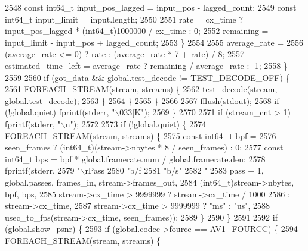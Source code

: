 \begin{DoxyCodeInclude}
{{{{{{{{{{{{{{{{{{{{{{{{{{{{{{{{{{{{{{{{{{{{{{{{{{{{{{{{{{{2548             \textcolor{keyword}{const} int64\_t input\_pos\_lagged = input\_pos - lagged\_count;
2549             \textcolor{keyword}{const} int64\_t input\_limit = input.length;
2550 
2551             rate = cx\_time ? input\_pos\_lagged * (int64\_t)1000000 / cx\_time : 0;
2552             remaining = input\_limit - input\_pos + lagged\_count;
2553           \}
2554 
2555           average\_rate =
2556               (average\_rate <= 0) ? rate : (average\_rate * 7 + rate) / 8;
2557           estimated\_time\_left = average\_rate ? remaining / average\_rate : -1;
2558         \}
2559 
2560         \textcolor{keywordflow}{if} (got\_data && global.test\_decode != TEST\_DECODE\_OFF) \{
2561           FOREACH\_STREAM(stream, streams) \{
2562             test\_decode(stream, global.test\_decode);
2563           \}
2564         \}
2565       \}
2566 
2567       fflush(stdout);
2568       \textcolor{keywordflow}{if} (!global.quiet) fprintf(stderr, \textcolor{stringliteral}{"\(\backslash\)033[K"});
2569     \}
2570 
2571     \textcolor{keywordflow}{if} (stream\_cnt > 1) fprintf(stderr, \textcolor{stringliteral}{"\(\backslash\)n"});
2572 
2573     \textcolor{keywordflow}{if} (!global.quiet) \{
2574       FOREACH\_STREAM(stream, streams) \{
2575         \textcolor{keyword}{const} int64\_t bpf =
2576             seen\_frames ? (int64\_t)(stream->nbytes * 8 / seen\_frames) : 0;
2577         \textcolor{keyword}{const} int64\_t bps = bpf * global.framerate.num / global.framerate.den;
2578         fprintf(stderr,
2579                 \textcolor{stringliteral}{"\(\backslash\)rPass %
2580                 \textcolor{stringliteral}{"b/f %
2581                 \textcolor{stringliteral}{"b/s"}
2582                 \textcolor{stringliteral}{" %
2583                 pass + 1, global.passes, frames\_in, stream->frames\_out,
2584                 (int64\_t)stream->nbytes, bpf, bps,
2585                 stream->cx\_time > 9999999 ? stream->cx\_time / 1000
2586                                           : stream->cx\_time,
2587                 stream->cx\_time > 9999999 ? \textcolor{stringliteral}{"ms"} : \textcolor{stringliteral}{"us"},
2588                 usec\_to\_fps(stream->cx\_time, seen\_frames));
2589       \}
2590     \}
2591 
2592     \textcolor{keywordflow}{if} (global.show\_psnr) \{
2593       \textcolor{keywordflow}{if} (global.codec->fourcc == AV1\_FOURCC) \{
2594         FOREACH\_STREAM(stream, streams) \{
}}}}}}}}}}}}}}}}}}}}}}}}}}}}}}}}}}}}}}}}}}}}}}}}}}}}}}}}}}}}}}
\end{DoxyCodeInclude}
